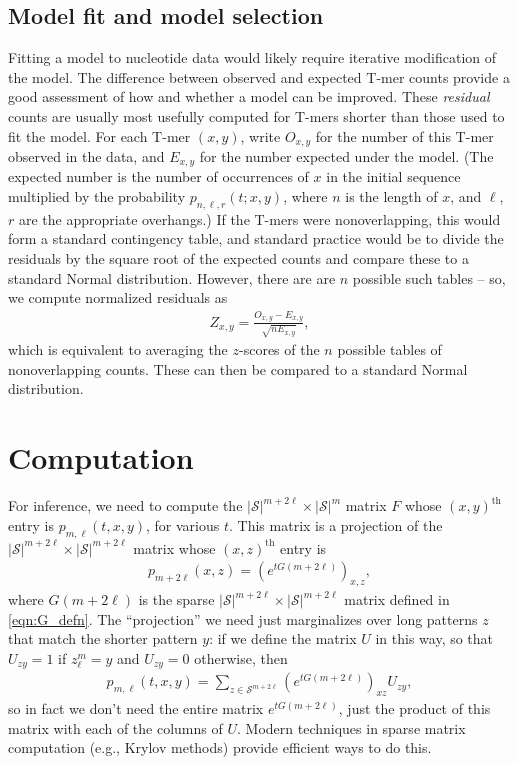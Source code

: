 \documentclass{article}
\newcommand{\calS}{\mathcal{S}}  %
\theoremstyle{plain}
\theoremstyle{definition}
\begin{document}
\subsection{Model fit and model selection}

Fitting a model to nucleotide data would likely require iterative modification of the model.
The difference between observed and expected T-mer counts provide a good assessment of how and whether a model can be improved.
These \emph{residual} counts are usually most usefully computed for T-mers shorter than those used to fit the model.
For each T-mer $(x,y)$, write $O_{x,y}$ for the number of this T-mer observed in the data,
and $E_{x,y}$ for the number expected under the model.
(The expected number is the number of occurrences of $x$ in the initial sequence
multiplied by the probability $p_{n,\ell,r}(t;x,y)$, where $n$ is the length of $x$,
and $\ell$, $r$ are the appropriate overhangs.)
If the T-mers were nonoverlapping, this would form a standard contingency table,
and standard practice would be to divide the residuals by the square root of the expected counts
and compare these to a standard Normal distribution.
However, there are are $n$ possible such tables --
so, we compute normalized residuals as
\begin{align}
    Z_{x,y} = \frac{ O_{x,y} - E_{x,y} }{ \sqrt{n E_{x,y}} },
\end{align}
which is equivalent to averaging the $z$-scores of the $n$ possible tables of nonoverlapping counts.
These can then be compared to a standard Normal distribution.

\section{Computation}

For inference, we need to compute the $|\calS|^{m+2\ell} \times |\calS|^m$ matrix $F$ whose $(x,y)^\text{th}$ entry is $p_{m,\ell}(t,x,y)$,
for various $t$.
This matrix is a projection of the $|\calS|^{m+2\ell} \times |\calS|^{m+2\ell}$ matrix whose $(x,z)^\text{th}$ entry is
\begin{align}
    p_{m+2\ell}(x,z) = \left( e^{t G(m+2\ell)} \right)_{x,z} ,
\end{align}
where $G(m+2\ell)$ is the sparse $|\calS|^{m+2\ell} \times |\calS|^{m+2\ell}$ matrix defined in \eqref{eqn:G_defn}.
The ``projection'' we need just marginalizes over long patterns $z$ that match the shorter pattern $y$:
if we define the matrix $U$ in this way, so that $U_{zy}=1$ if $z_\ell^m=y$ and $U_{zy}=0$ otherwise,
then
\begin{align} \label{eqn:Tmer_trans}
    p_{m,\ell}(t,x,y) = \sum_{z \in \calS^{m+2\ell}} \left( e^{t G(m+2\ell)} \right)_{xz} U_{zy} ,
\end{align}
so in fact we don't need the entire matrix $e^{t G(m+2\ell)}$,
just the product of this matrix with each of the columns of $U$.
Modern techniques in sparse matrix computation (e.g., Krylov methods) provide efficient ways to do this.
\end{document}
